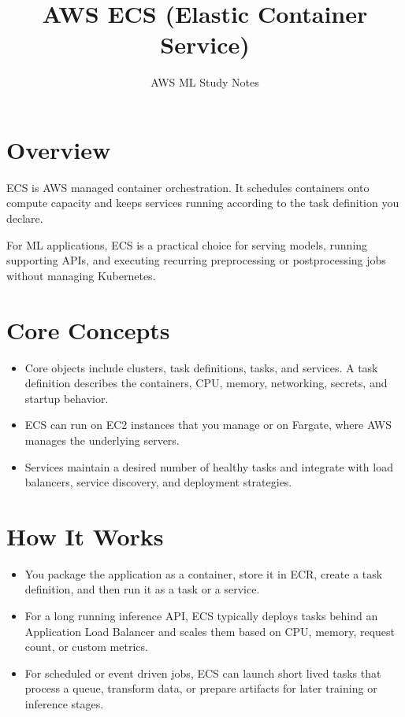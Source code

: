 \documentclass[10pt,twocolumn]{article}
\begin{document}
\title{\vspace{-1.6cm}AWS ECS (Elastic Container Service)}
\author{AWS ML Study Notes}
\date{}
\maketitle
\small

\section*{Overview}
ECS is AWS managed container orchestration. It schedules containers onto compute capacity and keeps services running according to the task definition you declare.

For ML applications, ECS is a practical choice for serving models, running supporting APIs, and executing recurring preprocessing or postprocessing jobs without managing Kubernetes.

\section*{Core Concepts}
\begin{itemize}
\item Core objects include clusters, task definitions, tasks, and services. A task definition describes the containers, CPU, memory, networking, secrets, and startup behavior.
\item ECS can run on EC2 instances that you manage or on Fargate, where AWS manages the underlying servers.
\item Services maintain a desired number of healthy tasks and integrate with load balancers, service discovery, and deployment strategies.
\end{itemize}

\section*{How It Works}
\begin{itemize}
\item You package the application as a container, store it in ECR, create a task definition, and then run it as a task or a service.
\item For a long running inference API, ECS typically deploys tasks behind an Application Load Balancer and scales them based on CPU, memory, request count, or custom metrics.
\item For scheduled or event driven jobs, ECS can launch short lived tasks that process a queue, transform data, or prepare artifacts for later training or inference stages.
\end{itemize}
\end{document}

